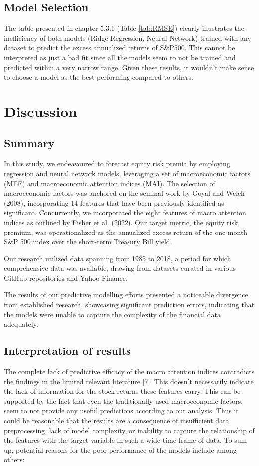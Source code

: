 \documentclass{article}
\begin{document}
\subsection{Model Selection}
The table presented in chapter 5.3.1 (Table \ref{tab:RMSE}) clearly illustrates the inefficiency of both models (Ridge Regression, Neural Network) trained with any dataset to predict the excess annualized returns of S\&P500. This cannot be interpreted as just a bad fit since all the models seem to not be trained and predicted within a very narrow range. Given these results, it wouldn't make sense to choose a model as the best performing compared to others.


\section{Discussion}

\subsection{Summary}
In this study, we endeavoured to forecast equity risk premia by employing regression and neural network models, leveraging a set of macroeconomic factors (MEF) and macroeconomic attention indices (MAI). The selection of macroeconomic factors was anchored on the seminal work by Goyal and Welch (2008), incorporating 14 features that have been previously identified as significant. Concurrently, we incorporated the eight features of macro attention indices as outlined by Fisher et al. (2022). Our target metric, the equity risk premium, was operationalized as the annualized excess return of the one-month S\&P 500 index over the short-term Treasury Bill yield.

Our research utilized data spanning from 1985 to 2018, a period for which comprehensive data was available, drawing from datasets curated in various GitHub repositories and Yahoo Finance. 

The results of our predictive modelling efforts presented a noticeable divergence from established research, showcasing significant prediction errors, indicating that the models were unable to capture the complexity of the financial data adequately.

\subsection{Interpretation of results}

The complete lack of predictive efficacy of the macro attention indices contradicts the findings in the limited relevant literature [7]. This doesn't necessarily indicate the lack of information for the stock returns these features carry. This can be supported by the fact that even the traditionally used macroeconomic factors, seem to not provide any useful predictions according to our analysis. Thus it could be reasonable that the results are a consequence of insufficient data preprocessing, lack of model complexity, or inability to capture the relationship of the features with the target variable in such a wide time frame of data. To sum up, potential reasons for the poor performance of the models include among others:
\end{document}
